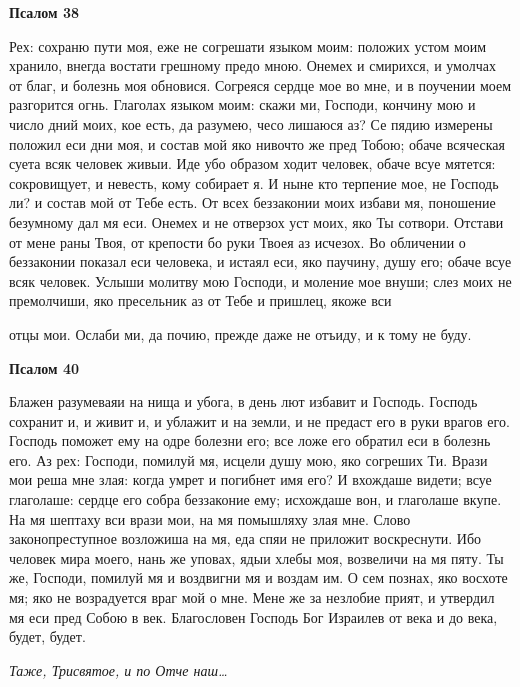  

\bfseries Псалом 38\normalfont{}


   Рех: сохраню пути моя, еже не согрешати языком моим: положих устом
моим хранило, внегда востати грешному предо мною. Онемех и смирихся, и
умолчах от благ, и болезнь моя обновися. Согреяся сердце мое во мне, и в
поучении моем разгорится огнь. Глаголах языком моим: скажи ми, Господи,
кончину мою и число дний моих, кое есть, да разумею, чесо лишаюся аз? Се
пядию измерены положил еси дни моя, и состав мой яко нивочто же пред
Тобою; обаче всяческая суета всяк человек живыи. Иде убо образом ходит
человек, обаче всуе мятется: сокровищует, и невесть, кому собирает я. И
ныне кто терпение мое, не Господь ли? и состав мой от Тебе есть. От всех
беззаконии моих избави мя, поношение безумному дал мя еси. Онемех и не
отверзох уст моих, яко Ты сотвори. Отстави от мене раны Твоя, от
крепости бо руки Твоея аз исчезох. Во обличении о беззаконии показал
еси человека, и истаял еси, яко паучину, душу его; обаче всуе всяк
человек. Услыши молитву мою Господи, и моление мое внуши; слез моих
не премолчиши, яко пресельник аз от Тебе и пришлец, якоже вси

отцы мои. Ослаби ми, да почию, прежде даже не отъиду, и к тому не
буду.



 

\bfseries Псалом 40\normalfont{}


   Блажен разумеваяи на нища и убога, в день лют избавит и Господь.
Господь сохранит и, и живит и, и ублажит и на земли, и не предаст
его в руки врагов его. Господь поможет ему на одре болезни его;
все ложе его обратил еси в болезнь его. Аз рех: Господи, помилуй
мя, исцели душу мою, яко согреших Ти. Врази мои реша мне злая:
когда умрет и погибнет имя его? И вхождаше видети; всуе глаголаше:
сердце его собра беззаконие ему; исхождаше вон, и глаголаше вкупе.
На мя шептаху вси врази мои, на мя помышляху злая мне. Слово
законопреступное возложиша на мя, еда спяи не приложит воскреснути. Ибо
человек мира моего, нань же уповах, ядыи хлебы моя, возвеличи
на мя пяту. Ты же, Господи, помилуй мя и воздвигни мя и воздам
им. О сем познах, яко восхоте мя; яко не возрадуется враг мой о
мне. Мене же за незлобие прият, и утвердил мя еси пред Собою в
век. Благословен Господь Бог Израилев от века и до века, будет,
будет.


 \itshape Таже,\normalfont{} \itshape Трисвятое\normalfont{}, \itshape и по\normalfont{} Отче наш…



